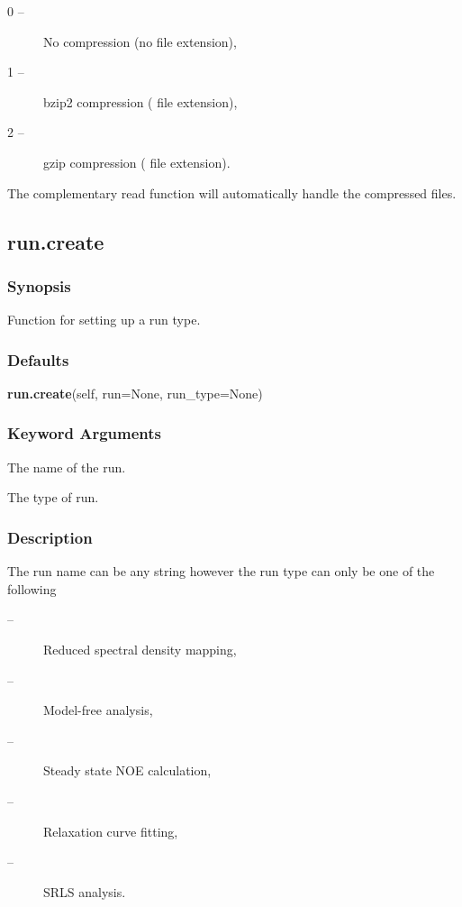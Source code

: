  \begin{description} 
 \item[0 --]  No compression (no file extension),  
 \item[1 --]  bzip2 compression ( file extension),  
 \item[2 --]  gzip compression ( file extension).  
 \end{description} 
  

 The complementary read function will automatically handle the compressed files. 
  

  

 \newpage 

 \subsection{run.create} 

  
 \subsubsection{Synopsis} 

 Function for setting up a run type. 
  

  
 \subsubsection{Defaults} 

 \textsf{\textbf{run.create}(self, run=None, run\_type=None)} 

  
 \subsubsection{Keyword Arguments} 

   The name of the run.   

   The type of run.  

  

  
 \subsubsection{Description} 

 The run name can be any string however the run type can only be one of the following 
  

 \begin{description} 
 \item[ --]  Reduced spectral density mapping,  
 \item[ --]  Model-free analysis,  
 \item[ --]  Steady state NOE calculation,  
 \item[ --]  Relaxation curve fitting,  
 \item[ --]  SRLS analysis.  
 \end{description} 
  

